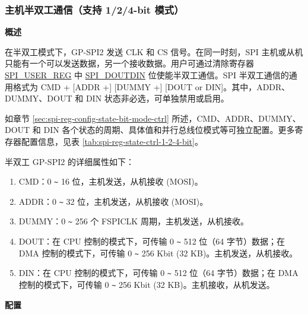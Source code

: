 \documentclass[main\_\_CN.tex]{subfiles}
\begin{document}
\subsubsection{主机半双工通信（支持 1/2/4-bit 模式）}
\label{sec:spi-half-duplex-1-2-4-bit}

\textbf{概述}

在半双工模式下，GP-SPI2 发送 CLK 和 CS 信号。在同一时刻，SPI 主机或从机只能有一个可以发送数据，另一个接收数据。用户可通过清除寄存器 \hyperref[regdesc:SPIUSERREG]{SPI\_USER\_REG} 中 \hyperref[fielddesc:SPIDOUTDIN]{SPI\_DOUTDIN} 位使能半双工通信。SPI 半双工通信的通用格式为 CMD + [ADDR +] [DUMMY +] [DOUT or DIN]。其中，ADDR、DUMMY、DOUT 和 DIN 状态非必选，可单独禁用或启用。

如章节  \ref{sec:spi-reg-config-state-bit-mode-ctrl} 所述，CMD、ADDR、DUMMY、DOUT 和 DIN 各个状态的周期、具体值和并行总线位模式等可独立配置。更多寄存器配置信息，见表  \ref{tab:spi-reg-state-ctrl-1-2-4-bit}。

半双工 GP-SPI2 的详细属性如下：

\begin{enumerate}
    \item CMD：0 \verb+~+ 16 位，主机发送，从机接收 (MOSI)。
    \item ADDR：0 \verb+~+ 32 位，主机发送，从机接收 (MOSI)。
    \item DUMMY：0 \verb+~+ 256 个 FSPICLK 周期，主机发送，从机接收。
    \item DOUT：在 CPU 控制的模式下，可传输 0 \verb+~+ 512 位（64 字节）数据；在 DMA 控制的模式下，可传输 0 \verb+~+ 256 Kbit (32 KB)。主机发送，从机接收。

    \item DIN：在 CPU 控制的模式下，可传输 0 \verb+~+ 512 位（64 字节）数据；在 DMA 控制的模式下，可传输 0 \verb+~+ 256 Kbit (32 KB)。主机接收，从机发送。
\end{enumerate}

\textbf{配置}
\end{document}
